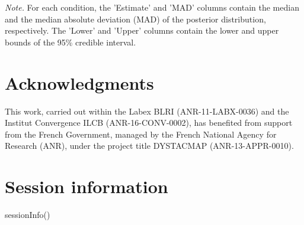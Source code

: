 \documentclass[
  11pt,
  english,
  ,doc,floatsintext]{apa6}
\newenvironment{Shaded}{}{}
\newcommand{\FunctionTok}[1]{\textcolor[rgb]{0.02,0.16,0.49}{#1}}
\newcommand{\NormalTok}[1]{#1}
\begin{document}
\begin{table}[htb]
\begin{center}
\begin{threeparttable}
{}

\begin{tablenotes}[para]
\normalsize{\textit{Note.} For each condition, the 'Estimate' and 'MAD' columns contain the
    median and the median absolute deviation (MAD) of the posterior distribution,
    respectively. The 'Lower' and 'Upper' columns contain the lower and upper
    bounds of the 95\% credible interval.}
\end{tablenotes}

\end{threeparttable}
\end{center}

\end{table}

\hypertarget{acknowledgments}{%
\section{Acknowledgments}\label{acknowledgments}}

This work, carried out within the Labex BLRI (ANR-11-LABX-0036) and the Institut Convergence ILCB (ANR-16-CONV-0002), has benefited from support from the French Government, managed by the French National Agency for Research (ANR), under the project title DYSTACMAP (ANR-13-APPR-0010).

\newpage

\hypertarget{session-information}{%
\section{Session information}\label{session-information}}

\begin{Shaded}
\begin{Highlighting}[]
\FunctionTok{sessionInfo}\NormalTok{()}
\end{Highlighting}
\end{Shaded}
\end{document}
